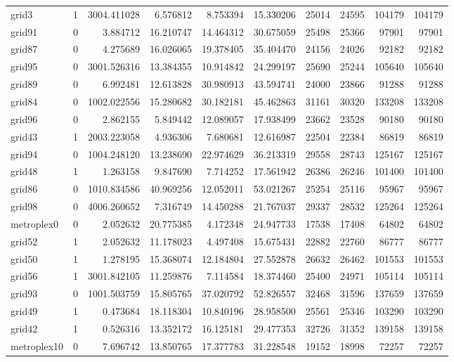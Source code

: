 \begin{longtable}{|l|r|r|r|r|r|r|r|r|r|}
grid3 & 1 & 3004.411028 & 6.576812 & 8.753394 & 15.330206 & 25014 & 24595 & 104179 & 104179 \\
grid91 & 0 & 3.884712 & 16.210747 & 14.464312 & 30.675059 & 25498 & 25366 & 97901 & 97901 \\
grid87 & 0 & 4.275689 & 16.026065 & 19.378405 & 35.404470 & 24156 & 24026 & 92182 & 92182 \\
grid95 & 0 & 3001.526316 & 13.384355 & 10.914842 & 24.299197 & 25690 & 25244 & 105640 & 105640 \\
grid89 & 0 & 6.992481 & 12.613828 & 30.980913 & 43.594741 & 24000 & 23866 & 91288 & 91288 \\
grid84 & 0 & 1002.022556 & 15.280682 & 30.182181 & 45.462863 & 31161 & 30320 & 133208 & 133208 \\
grid96 & 0 & 2.862155 & 5.849442 & 12.089057 & 17.938499 & 23662 & 23528 & 90180 & 90180 \\
grid43 & 1 & 2003.223058 & 4.936306 & 7.680681 & 12.616987 & 22504 & 22384 & 86819 & 86819 \\
grid94 & 0 & 1004.248120 & 13.238690 & 22.974629 & 36.213319 & 29558 & 28743 & 125167 & 125167 \\
grid48 & 1 & 1.263158 & 9.847690 & 7.714252 & 17.561942 & 26386 & 26246 & 101400 & 101400 \\
grid86 & 0 & 1010.834586 & 40.969256 & 12.052011 & 53.021267 & 25254 & 25116 & 95967 & 95967 \\
grid98 & 0 & 4006.260652 & 7.316749 & 14.450288 & 21.767037 & 29337 & 28532 & 125264 & 125264 \\
metroplex0 & 0 & 2.052632 & 20.775385 & 4.172348 & 24.947733 & 17538 & 17408 & 64802 & 64802 \\
grid52 & 1 & 2.052632 & 11.178023 & 4.497408 & 15.675431 & 22882 & 22760 & 86777 & 86777 \\
grid50 & 1 & 1.278195 & 15.368074 & 12.184804 & 27.552878 & 26632 & 26462 & 101553 & 101553 \\
grid56 & 1 & 3001.842105 & 11.259876 & 7.114584 & 18.374460 & 25400 & 24971 & 105114 & 105114 \\
grid93 & 0 & 1001.503759 & 15.805765 & 37.020792 & 52.826557 & 32468 & 31596 & 137659 & 137659 \\
grid49 & 1 & 0.473684 & 18.118304 & 10.840196 & 28.958500 & 25561 & 25346 & 103290 & 103290 \\
grid42 & 1 & 0.526316 & 13.352172 & 16.125181 & 29.477353 & 32726 & 31352 & 139158 & 139158 \\
metroplex10 & 0 & 7.696742 & 13.850765 & 17.377783 & 31.228548 & 19152 & 18998 & 72257 & 72257 \\

\end{longtable}
